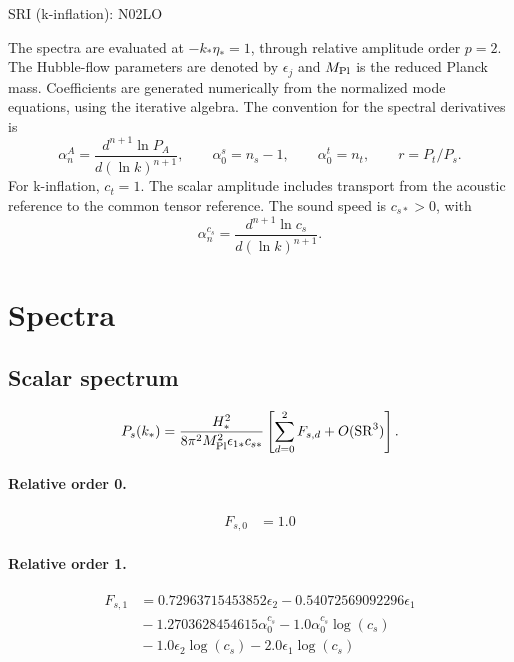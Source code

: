 \documentclass[10pt]{article}
\begin{document}
\begin{center}\Large SRI (k-inflation): N02LO\end{center}
The spectra are evaluated at $-k_*\eta_*=1$, through relative amplitude
order $p=2$. The Hubble-flow parameters are denoted by $\epsilon_j$
and $M_{\rm Pl}$ is the reduced Planck mass. Coefficients are generated
numerically from the normalized mode equations, using the iterative algebra.
The convention for the spectral derivatives is
\[
\alpha_n^A=\frac{d^{n+1}\ln P_A}{d(\ln k)^{n+1}},\qquad
\alpha_0^s=n_s-1,\qquad\alpha_0^t=n_t,\qquad r=P_t/P_s.
\]
For k-inflation, $c_t=1$. The scalar amplitude includes transport from the acoustic reference to the common tensor reference. The sound speed is $c_{s*}>0$, with
\[\alpha_n^{c_s}=\frac{d^{n+1}\ln c_s}{d(\ln k)^{n+1}}.\]
\section{Spectra}

\subsection{Scalar spectrum}
\[P_s(k_*)=\frac{H_*^2}{8\pi^2M_{\rm Pl}^2\epsilon_{1*}c_{s*}}\left[\sum_{d=0}^{2}F_{s,d}+O(\mathrm{SR}^{3})\right].\]
\paragraph{Relative order 0.}
\begin{align*}
F_{s,0} &= 1.0
\end{align*}

\paragraph{Relative order 1.}
\begin{align*}
F_{s,1} &= 0.72963715453852 \epsilon_{2} - 0.54072569092296 \epsilon_{1} \\
&{}  - 1.2703628454615 \alpha_{0}^{c_s} - 1.0 \alpha_{0}^{c_s} \log{\left(c_{s} \right)} \\
&{}  - 1.0 \epsilon_{2} \log{\left(c_{s} \right)} - 2.0 \epsilon_{1} \log{\left(c_{s} \right)}
\end{align*}
\end{document}
